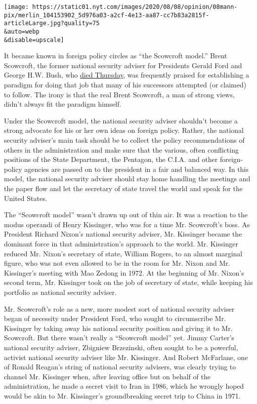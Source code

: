 \texttt{[image: https://static01.nyt.com/images/2020/08/08/opinion/08mann-pix/merlin\_104153902\_5d976a03-a2cf-4e13-aa87-cc7b83a2815f-articleLarge.jpg?quality=75\\\&auto=webp\\\&disable=upscale]}

It became known in foreign policy circles as ``the Scowcroft model.''
Brent Scowcroft, the former national security adviser for Presidents
Gerald Ford and George H.W. Bush, who
\href{https://www.nytimes.com/2020/08/07/us/politics/brent-scowcroft-dead.html}{died
Thursday}, was frequently praised for establishing a paradigm for doing
that job that many of his successors attempted (or claimed) to follow.
The irony is that the real Brent Scowcroft, a man of strong views,
didn't always fit the paradigm himself.

Under the Scowcroft model, the national security adviser shouldn't
become a strong advocate for his or her own ideas on foreign policy.
Rather, the national security adviser's main task should be to collect
the policy recommendations of others in the administration and make sure
that the various, often conflicting positions of the State Department,
the Pentagon, the C.I.A. and other foreign-policy agencies are passed on
to the president in a fair and balanced way. In this model, the national
security adviser should stay home handling the meetings and the paper
flow and let the secretary of state travel the world and speak for the
United States.

The ``Scowcroft model'' wasn't drawn up out of thin air. It was a
reaction to the modus operandi of Henry Kissinger, who was for a time
Mr. Scowcroft's boss. As President Richard Nixon's national security
adviser, Mr. Kissinger became the dominant force in that
administration's approach to the world. Mr. Kissinger reduced Mr.
Nixon's secretary of state, William Rogers, to an almost marginal
figure, who was not even allowed to be in the room for Mr. Nixon and Mr.
Kissinger's meeting with Mao Zedong in 1972. At the beginning of Mr.
Nixon's second term, Mr. Kissinger took on the job of secretary of
state, while keeping his portfolio as national security adviser.

Mr. Scowcroft's role as a new, more modest sort of national security
adviser began of necessity under President Ford, who sought to
circumscribe Mr. Kissinger by taking away his national security position
and giving it to Mr. Scowcroft. But there wasn't really a ``Scowcroft
model'' yet. Jimmy Carter's national security adviser, Zbigniew
Brzezinski, often sought to be a powerful, activist national security
adviser like Mr. Kissinger. And Robert McFarlane, one of Ronald Reagan's
string of national security advisers, was clearly trying to channel Mr.
Kissinger when, after leaving office but on behalf of the
administration, he made a secret visit to Iran in 1986, which he wrongly
hoped would be akin to Mr. Kissinger's groundbreaking secret trip to
China in 1971.

